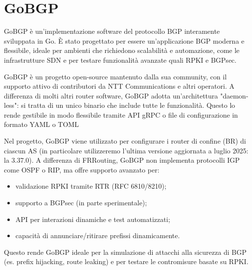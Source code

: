 \documentclass[12pt,a4paper,twoside]{book}
\begin{document}
\section{GoBGP}
GoBGP è un'implementazione software del protocollo \ac{BGP} interamente sviluppata in Go. È stato progettato per essere un'applicazione \ac{BGP} moderna e flessibile, ideale per ambienti che richiedono scalabilità e automazione, come le infrastrutture \ac{SDN} e per testare funzionalità avanzate quali \ac{RPKI} e BGPsec. \cite{gobgp-docs}

GoBGP è un progetto open-source mantenuto dalla sua community, con il supporto attivo di contributori da NTT Communications e altri operatori. A differenza di molti altri router software, GoBGP adotta un'architettura "daemon-less": si tratta di un unico binario che include tutte le funzionalità. Questo lo rende gestibile in modo flessibile tramite API gRPC o file di configurazione in formato YAML o TOML \cite{gobgp-api}

Nel progetto, GoBGP viene utilizzato per configurare i router di confine (\ac{BR}) di ciascun \ac{AS} (in particolare utilizzeremo l'ultima versione aggiornata a luglio 2025: la 3.37.0). A differenza di FRRouting, GoBGP non implementa protocolli \ac{IGP} come OSPF o RIP, ma offre supporto avanzato per:
\begin{itemize}
    \item validazione \ac{RPKI} tramite RTR (RFC 6810/8210);
    \item supporto a BGPsec (in parte sperimentale);
    \item API per interazioni dinamiche e test automatizzati;
    \item capacità di annunciare/ritirare prefissi dinamicamente.
\end{itemize}

Questo rende GoBGP ideale per la simulazione di attacchi alla sicurezza di \ac{BGP} (es. prefix hijacking, route leaking) e per testare le contromisure basate su RPKI.
\end{document}
